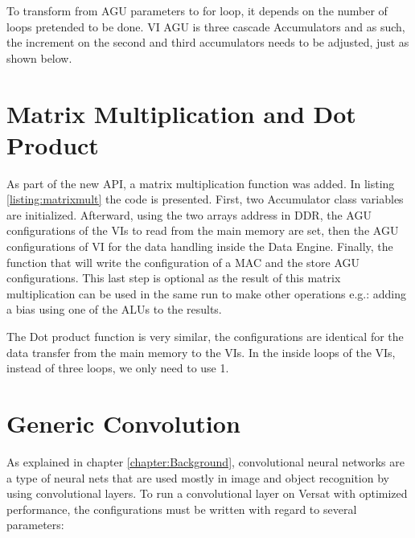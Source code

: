 

To transform from AGU parameters to for loop, it depends on the number of loops pretended to be done. VI AGU is three  cascade Accumulators
and as such, the increment on the second and third accumulators needs to be adjusted, just as shown below.



\section{Matrix Multiplication and Dot Product}

As part of the new API, a matrix multiplication function was added. In listing \ref{listing:matrixmult} the code is presented. First, two Accumulator class variables are initialized.
Afterward, using the two arrays address in DDR, the AGU configurations of the VIs to read from the main memory are set, then the AGU configurations of VI for the data handling inside the Data Engine.
Finally, the function that will write the configuration of a MAC and the store AGU configurations. This last step is optional as the result of this matrix multiplication can be used in the same run
to make other operations e.g.: adding a bias using one of the ALUs to the results.



The Dot product function is very similar, the configurations are identical for the data transfer from the main memory to the VIs. In the inside loops of the VIs, instead of three  loops, we only need to use 
1.

\section{Generic Convolution}

As explained in chapter \ref*{chapter:Background}, convolutional neural networks are a type of neural nets that are 
used mostly in image and object recognition by using convolutional layers. To run a convolutional layer on Versat with
optimized performance, the configurations must be written with regard to several parameters:

